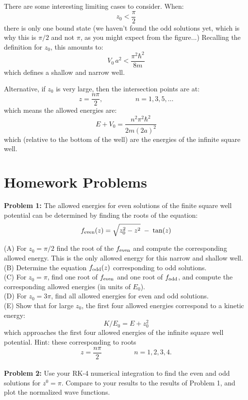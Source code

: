 \documentclass[12pt]{book}
\begin{document}
There are some interesting limiting cases to consider.  When:
$$z_0 < \frac{\pi}{2}$$
there is only one bound state (we haven't found the odd solutions yet, which is why this is $\pi/2$ and not $\pi$, as you might expect from the figure...)  Recalling the definition for $z_0$, this amounts to:
$$V_0\,a^2 < \frac{\pi^2 \hbar^2}{8m}$$
which defines a shallow and narrow well.

Alternative, if $z_0$ is very large, then the intersection points are at:
$$z = \frac{n\pi}{2}, \hspace{2cm} n=1,3,5,\ldots$$
which means the allowed energies are:
$$E + V_0 = \frac{n^2\pi^2\hbar^2}{2m(2a)^2}$$
which (relative to the bottom of the well) are the energies of the infinite square well.

\section{Homework Problems}

\noindent
{\bf Problem 1:}  The allowed energies for even solutions of the finite square well potential can be determined by finding the roots of the equation:
$$f_{\rm even}(z) = \sqrt{z_0^2-z^2} \; - \; \tan(z)$$

\noindent
(A) For $z_0 = \pi/2$ find the root of the $f_{\rm even}$ and compute the corresponding allowed energy.  This is the only allowed energy for this narrow and shallow well.\\[5pt]

\noindent
(B) Determine the equation $f_{\rm odd}(z)$ corresponding to odd solutions.\\[5pt]

\noindent
(C) For $z_0 = \pi$, find one root of $f_{\rm even}$ and one root of $f_{\rm odd}$, and compute the corresponding allowed energies (in units of $E_0$).\\[5pt]

\noindent
(D) For $z_0 = 3\pi$, find all allowed energies for even and odd solutions.\\[5pt]

\noindent
(E) Show that for large $z_0$, the first four allowed energies correspond to a kinetic energy:
$$K/E_0 = E + z_0^2$$
which approaches the first four allowed energies of the infinite square well potential.  Hint:  these corresponding to roots
$$z = \frac{n \pi}{2} \hspace{2cm} n=1,2,3,4.$$\\[5pt]

\noindent
{\bf Problem 2:} Use your RK-4 numerical integration to find the even and odd solutions for $z^0 = \pi$.  Compare to your results to the results of Problem 1, and plot the normalized wave functions.\\[5pt]
\end{document}
